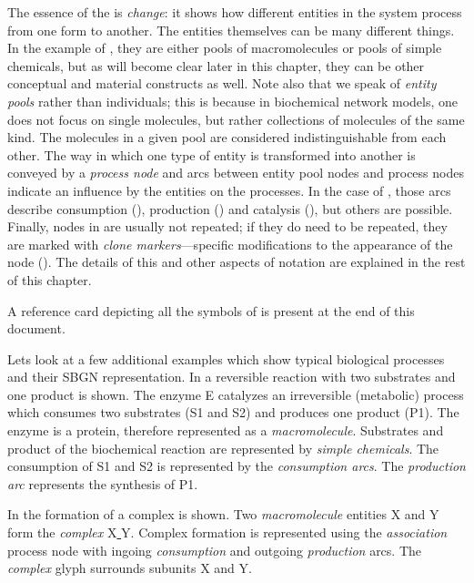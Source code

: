 The essence of the \PDs is \emph{change}: it shows how different entities in the system process from one form to another.  The entities themselves can be many different things.  In the example of , they are either pools of macromolecules or pools of simple chemicals, but as will become clear later in this chapter, they can be other conceptual and material constructs as well.  Note also that we speak of \emph{entity pools} rather than individuals; this is because in biochemical network models, one does not focus on single molecules, but rather collections of molecules of the same kind.  The molecules in a given pool are considered indistinguishable from each other.  The way in which one type of entity is transformed into another is conveyed by a \emph{process node} and arcs between entity pool nodes and process nodes indicate an influence by the entities on the processes.  In the case of , those arcs describe consumption (), production () and catalysis
(), but others are possible.  Finally, nodes in \PDs are usually not repeated; if they do need to be repeated, they are marked with \emph{clone markers}---specific modifications to the appearance of the node (). The details of this and other aspects of \PD notation are explained in the rest of this chapter.

A reference card depicting all the symbols of \SBGNPDLone is present at the end of this document.

Lets look at a few additional examples which show typical biological processes and their SBGN \PD representation. In  a reversible reaction with two substrates and one product is shown. The enzyme E catalyzes an irreversible (metabolic) process which consumes two substrates (S1 and S2) and produces one product (P1). The enzyme is a protein, therefore represented as a \emph{macromolecule}. Substrates and product of the biochemical reaction are represented by \emph{simple chemicals}. The consumption of S1 and S2 is represented by the \emph{consumption arcs}. The \emph{production arc} represents the synthesis of P1. 

In  the formation of a complex is shown. Two \emph{macromolecule} entities X and Y form the \emph{complex} X\underline{ }Y. Complex formation is represented using the \emph{association} process node with ingoing \emph{consumption} and outgoing \emph{production} arcs. The \emph{complex} glyph surrounds subunits X and Y.

